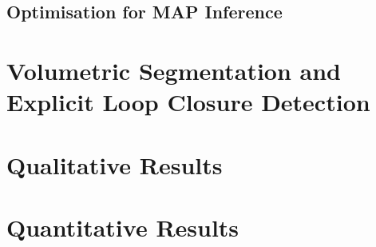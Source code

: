 \subsection{Optimisation for MAP Inference}
\label{subsec:probobj_map_optimisation}

\section{Volumetric Segmentation and Explicit Loop Closure Detection}

\section{Qualitative Results}

\section{Quantitative Results}